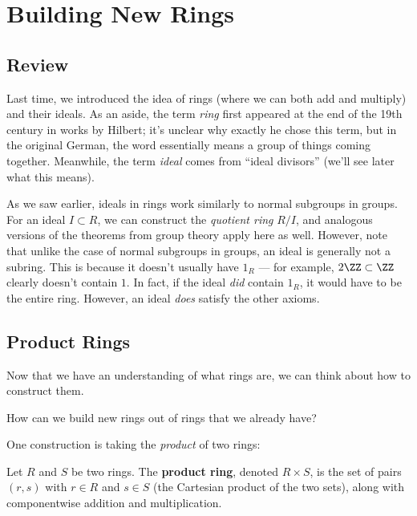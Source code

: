 

\section{Building New Rings}

\subsection{Review}

Last time, we introduced the idea of rings (where we can both add and multiply) and their ideals. As an aside, the term \emph{ring} first appeared at the end of the 19th century in works by Hilbert; it's unclear why exactly he chose this term, but in the original German, the word essentially means a group of things coming together. Meanwhile, the term \emph{ideal} comes from ``ideal divisors'' (we'll see later what this means). 

As we saw earlier, ideals in rings work similarly to normal subgroups in groups. For an ideal $I \subset R$, we can construct the \emph{quotient ring} $R/I$, and analogous versions of the theorems from group theory apply here as well. However, note that unlike the case of normal subgroups in groups, an ideal is generally not a subring. This is because it doesn't usually have $1_R$ --- for example, $2\ZZ \subset \ZZ$ clearly doesn't contain $1$. In fact, if the ideal \emph{did} contain $1_R$, it would have to be the entire ring. However, an ideal \emph{does} satisfy the other axioms. 

\subsection{Product Rings}

Now that we have an understanding of what rings are, we can think about how to construct them. 

\begin{qq}
How can we build new rings out of rings that we already have?
\end{qq}

One construction is taking the \emph{product} of two rings:

\begin{definition}
Let $R$ and $S$ be two rings. The \textbf{product ring}, denoted $R \times S$, is the set of pairs $(r, s)$ with $r \in R$ and $s \in S$ (the Cartesian product of the two sets), along with componentwise addition and multiplication.
\end{definition}

